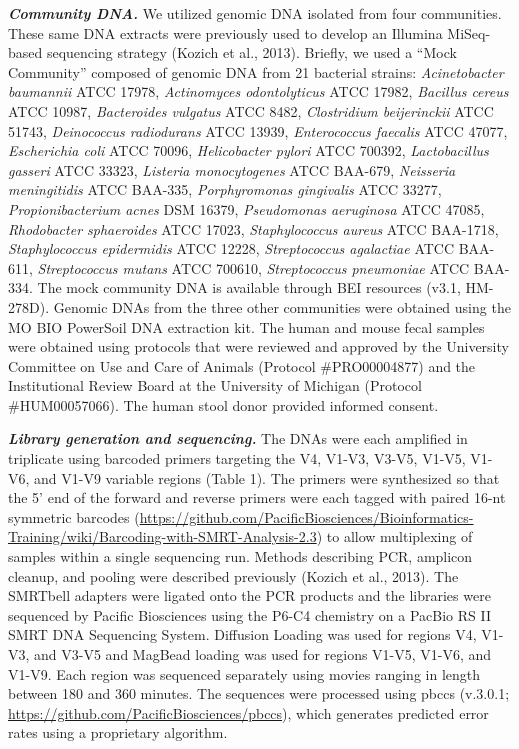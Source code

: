 \documentclass[11pt,]{article}
\begin{document}
\textbf{\emph{Community DNA.}} We utilized genomic DNA isolated from
four communities. These same DNA extracts were previously used to
develop an Illumina MiSeq-based sequencing strategy (Kozich et al.,
2013). Briefly, we used a ``Mock Community'' composed of genomic DNA
from 21 bacterial strains: \emph{Acinetobacter baumannii} ATCC 17978,
\emph{Actinomyces odontolyticus} ATCC 17982, \emph{Bacillus cereus} ATCC
10987, \emph{Bacteroides vulgatus} ATCC 8482, \emph{Clostridium
beijerinckii} ATCC 51743, \emph{Deinococcus radiodurans} ATCC 13939,
\emph{Enterococcus faecalis} ATCC 47077, \emph{Escherichia coli} ATCC
70096, \emph{Helicobacter pylori} ATCC 700392, \emph{Lactobacillus
gasseri} ATCC 33323, \emph{Listeria monocytogenes} ATCC BAA-679,
\emph{Neisseria meningitidis} ATCC BAA-335, \emph{Porphyromonas
gingivalis} ATCC 33277, \emph{Propionibacterium acnes} DSM 16379,
\emph{Pseudomonas aeruginosa} ATCC 47085, \emph{Rhodobacter sphaeroides}
ATCC 17023, \emph{Staphylococcus aureus} ATCC BAA-1718,
\emph{Staphylococcus epidermidis} ATCC 12228, \emph{Streptococcus
agalactiae} ATCC BAA-611, \emph{Streptococcus mutans} ATCC 700610,
\emph{Streptococcus pneumoniae} ATCC BAA-334. The mock community DNA is
available through BEI resources (v3.1, HM-278D). Genomic DNAs from the
three other communities were obtained using the MO BIO PowerSoil DNA
extraction kit. The human and mouse fecal samples were obtained using
protocols that were reviewed and approved by the University Committee on
Use and Care of Animals (Protocol \#PRO00004877) and the Institutional
Review Board at the University of Michigan (Protocol \#HUM00057066). The
human stool donor provided informed consent.

\textbf{\emph{Library generation and sequencing.}} The DNAs were each
amplified in triplicate using barcoded primers targeting the V4, V1-V3,
V3-V5, V1-V5, V1-V6, and V1-V9 variable regions (Table 1). The primers
were synthesized so that the 5' end of the forward and reverse primers
were each tagged with paired 16-nt symmetric barcodes
(\url{https://github.com/PacificBiosciences/Bioinformatics-Training/wiki/Barcoding-with-SMRT-Analysis-2.3})
to allow multiplexing of samples within a single sequencing run. Methods
describing PCR, amplicon cleanup, and pooling were described previously
(Kozich et al., 2013). The SMRTbell adapters were ligated onto the PCR
products and the libraries were sequenced by Pacific Biosciences using
the P6-C4 chemistry on a PacBio RS II SMRT DNA Sequencing System.
Diffusion Loading was used for regions V4, V1-V3, and V3-V5 and MagBead
loading was used for regions V1-V5, V1-V6, and V1-V9. Each region was
sequenced separately using movies ranging in length between 180 and 360
minutes. The sequences were processed using pbccs (v.3.0.1;
\url{https://github.com/PacificBiosciences/pbccs}), which generates
predicted error rates using a proprietary algorithm.
\end{document}
